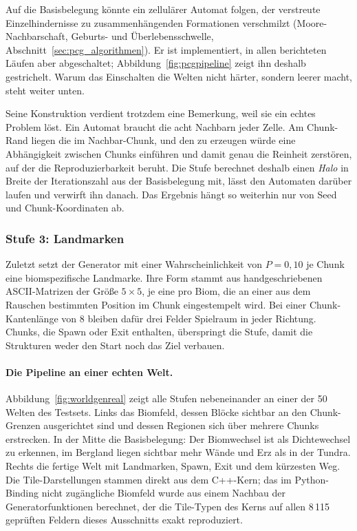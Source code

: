 \documentclass[11pt,a4paper]{article}
\begin{document}
Auf die Basisbelegung könnte ein zellulärer Automat folgen, der verstreute
Einzelhindernisse zu zusammenhängenden Formationen verschmilzt
(Moore-Nachbarschaft, Geburts- und Überlebensschwelle,
Abschnitt~\ref{sec:pcg_algorithmen}). Er ist implementiert, in allen
berichteten Läufen aber abgeschaltet; Abbildung~\ref{fig:pcgpipeline} zeigt ihn
deshalb gestrichelt. Warum das Einschalten die Welten nicht härter, sondern
leerer macht, steht weiter unten.

Seine Konstruktion verdient trotzdem eine Bemerkung, weil sie ein echtes
Problem löst. Ein Automat braucht die acht Nachbarn jeder Zelle. Am Chunk-Rand
liegen die im Nachbar-Chunk, und den zu erzeugen würde eine Abhängigkeit
zwischen Chunks einführen und damit genau die Reinheit zerstören, auf der die
Reproduzierbarkeit beruht. Die Stufe berechnet deshalb einen \emph{Halo} in
Breite der Iterationszahl aus der Basisbelegung mit, lässt den Automaten
darüber laufen und verwirft ihn danach. Das Ergebnis hängt so weiterhin nur von
Seed und Chunk-Koordinaten ab.

\subsubsection*{Stufe 3: Landmarken}

Zuletzt setzt der Generator mit einer Wahrscheinlichkeit von $P = 0{,}10$ je
Chunk eine biomspezifische Landmarke. Ihre Form stammt aus handgeschriebenen
ASCII-Matrizen der Größe $5\times5$, je eine pro Biom, die an einer aus dem
Rauschen bestimmten Position im Chunk eingestempelt wird. Bei einer
Chunk-Kantenlänge von 8 bleiben dafür drei Felder Spielraum in jeder Richtung.
Chunks, die Spawn oder Exit enthalten, überspringt die Stufe, damit die
Strukturen weder den Start noch das Ziel verbauen.

\paragraph{Die Pipeline an einer echten Welt.} Abbildung~\ref{fig:worldgenreal}
zeigt alle Stufen nebeneinander an einer der 50 Welten des Testsets. Links das
Biomfeld, dessen Blöcke sichtbar an den Chunk-Grenzen ausgerichtet sind und
dessen Regionen sich über mehrere Chunks erstrecken. In der Mitte die
Basisbelegung: Der Biomwechsel ist als Dichtewechsel zu erkennen, im Bergland
liegen sichtbar mehr Wände und Erz als in der Tundra. Rechts die fertige Welt
mit Landmarken, Spawn, Exit und dem kürzesten Weg. Die Tile-Darstellungen
stammen direkt aus dem C++-Kern; das im Python-Binding nicht zugängliche
Biomfeld wurde aus einem Nachbau der Generatorfunktionen berechnet, der die
Tile-Typen des Kerns auf allen 8\,115 geprüften Feldern dieses Ausschnitts
exakt reproduziert.
\end{document}
